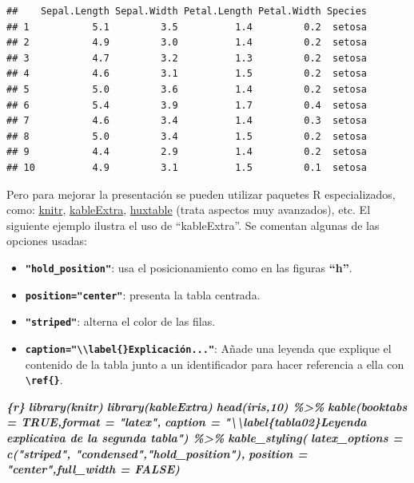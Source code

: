 \documentclass[12pt,a4paper,oneside,]{article}
\newenvironment{Shaded}{\begin{snugshade}}{\end{snugshade}}
\newcommand{\InformationTok}[1]{\textcolor[rgb]{0.56,0.35,0.01}{\textbf{\textit{#1}}}}
\providecommand{\tightlist}{%
  \setlength{\itemsep}{0pt}\setlength{\parskip}{0pt}}
\numberwithin{dummy}{section}
\theoremstyle{ocrenumbox}
\theoremstyle{blacknumex}
\theoremstyle{blacknumbox}
\theoremstyle{ocrenum}
\theoremstyle{ocrenum}
\begin{document}
\begin{verbatim}
##    Sepal.Length Sepal.Width Petal.Length Petal.Width Species
## 1           5.1         3.5          1.4         0.2  setosa
## 2           4.9         3.0          1.4         0.2  setosa
## 3           4.7         3.2          1.3         0.2  setosa
## 4           4.6         3.1          1.5         0.2  setosa
## 5           5.0         3.6          1.4         0.2  setosa
## 6           5.4         3.9          1.7         0.4  setosa
## 7           4.6         3.4          1.4         0.3  setosa
## 8           5.0         3.4          1.5         0.2  setosa
## 9           4.4         2.9          1.4         0.2  setosa
## 10          4.9         3.1          1.5         0.1  setosa
\end{verbatim}

Pero para mejorar la presentación se pueden utilizar paquetes R
especializados, como:
\href{https://cran.r-project.org/web/packages/knitr/index.html}{knitr},
\href{https://cran.r-project.org/web/packages/kableExtra/index.html}{kableExtra},
\href{https://cran.r-project.org/web/packages/huxtable/}{huxtable}
(trata aspectos muy avanzados), etc. El siguiente ejemplo ilustra el uso
de ``kableExtra''. Se comentan algunas de las opciones usadas:

\begin{itemize}
\tightlist
\item
  \textbf{\texttt{"hold\_position"}}: usa el posicionamiento como en las
  figuras \textbf{``h''}.
\item
  \textbf{\texttt{position="center"}}: presenta la tabla centrada.
\item
  \textbf{\texttt{"striped"}}: alterna el color de las filas.
\item
  \textbf{\texttt{caption="\textbackslash{}\textbackslash{}label\{\}Explicación..."}}:
  Añade una leyenda que explique el contenido de la tabla junto a un
  identificador para hacer referencia a ella con
  \textbf{\texttt{\textbackslash{}ref\{\}}}.
\end{itemize}

\begin{Shaded}
\begin{Highlighting}[]
\InformationTok{\textasciigrave{}\textasciigrave{}\textasciigrave{}\{r\}}
\InformationTok{library(knitr)}
\InformationTok{library(kableExtra) }
\InformationTok{head(iris,10) \%\textgreater{}\%}
\InformationTok{ kable(booktabs = TRUE,format = "latex",}
\InformationTok{  caption = "\textbackslash{}\textbackslash{}label\{tabla02\}Leyenda explicativa de la segunda tabla") \%\textgreater{}\%}
\InformationTok{ kable\_styling(}
\InformationTok{  latex\_options = c("striped", "condensed","hold\_position"), }
\InformationTok{  position = "center",full\_width = FALSE)}
\InformationTok{\textasciigrave{}\textasciigrave{}\textasciigrave{}}
\end{Highlighting}
\end{Shaded}
\end{document}

